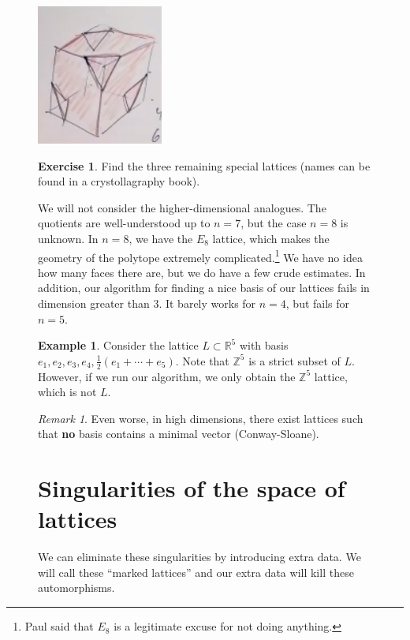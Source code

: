 \documentclass[leqno, openany]{memoir}
\theoremstyle{definition}
\newtheorem{exm}[thm]{Example}
\newtheorem{exer}[thm]{Exercise}
\theoremstyle{remark}
\newtheorem{rmk}[thm]{Remark}
\theoremstyle{plain}
\theoremstyle{definition}
\theoremstyle{remark}
\newcommand{\R}{\mathbb{R}}
\newcommand{\Z}{\mathbb{Z}}
\begin{document}
\begin{figure}[H] \centering \includegraphics[scale=0.5]{voronoi.png}
    \caption{Soul\'e's cube. This was used to compute the cohomology of
    $SL_3(\Z)$.}%

\begin{exer} Find the three remaining special lattices (names can be found in a
crystollagraphy book).  \end{exer}

We will not consider the higher-dimensional analogues. The quotients are
well-understood up to $n=7$, but the case $n=8$ is unknown. In $n=8$, we have
the $E_8$ lattice, which makes the geometry of the polytope extremely
complicated.\footnote{Paul said that $E_8$ is a legitimate excuse for not doing
anything.} We have no idea how many faces there are, but we do have a few crude
estimates. In addition, our algorithm for finding a nice basis of our lattices
fails in dimension greater than $3$. It barely works for $n=4$, but fails for
$n=5$.

\begin{exm} Consider the lattice $L \subset \R^5$ with basis $e_1, e_2, e_3,
    e_4, \frac{1}{2} (e_1 + \cdots + e_5)$. Note that $\Z^5$ is a strict subset
    of $L$. However, if we run our algorithm, we only obtain the $\Z^5$
    lattice, which is not $L$.  \end{exm}

\begin{rmk} Even worse, in high dimensions, there exist lattices such that
\textbf{no} basis contains a minimal vector (Conway-Sloane).  \end{rmk}

\section{Singularities of the space of lattices}%
\label{sec:singularities_in_gamma_backslash_x_}

We can eliminate these singularities by introducing extra data. We will call
these ``marked lattices'' and our extra data will kill these automorphisms.


\end{figure}
\end{document}

